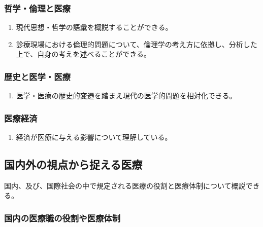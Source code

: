 \hypertarget{ux54f2ux5b66ux502bux7406ux3068ux533bux7642}{%
\subsubsection{哲学・倫理と医療}\label{ux54f2ux5b66ux502bux7406ux3068ux533bux7642}}

\begin{enumerate}
\def\labelenumi{\arabic{enumi}.}
\tightlist
\item
  現代思想・哲学の語彙を概説することができる。
\item
  診療現場における倫理的問題について、倫理学の考え方に依拠し、分析した上で、自身の考えを述べることができる。
\end{enumerate}

\hypertarget{ux6b74ux53f2ux3068ux533bux5b66ux533bux7642}{%
\subsubsection{歴史と医学・医療}\label{ux6b74ux53f2ux3068ux533bux5b66ux533bux7642}}

\begin{enumerate}
\def\labelenumi{\arabic{enumi}.}
\tightlist
\item
  医学・医療の歴史的変遷を踏まえ現代の医学的問題を相対化できる。
\end{enumerate}

\hypertarget{ux533bux7642ux7d4cux6e08}{%
\subsubsection{医療経済}\label{ux533bux7642ux7d4cux6e08}}

\begin{enumerate}
\def\labelenumi{\arabic{enumi}.}
\tightlist
\item
  経済が医療に与える影響について理解している。
\end{enumerate}

\hypertarget{ux56fdux5185ux5916ux306eux8996ux70b9ux304bux3089ux6349ux3048ux308bux533bux7642}{%
\subsection{国内外の視点から捉える医療}\label{ux56fdux5185ux5916ux306eux8996ux70b9ux304bux3089ux6349ux3048ux308bux533bux7642}}

国内、及び、国際社会の中で規定される医療の役割と医療体制について概説できる。

\hypertarget{ux56fdux5185ux306eux533bux7642ux8077ux306eux5f79ux5272ux3084ux533bux7642ux4f53ux5236}{%
\subsubsection{国内の医療職の役割や医療体制}\label{ux56fdux5185ux306eux533bux7642ux8077ux306eux5f79ux5272ux3084ux533bux7642ux4f53ux5236}}

